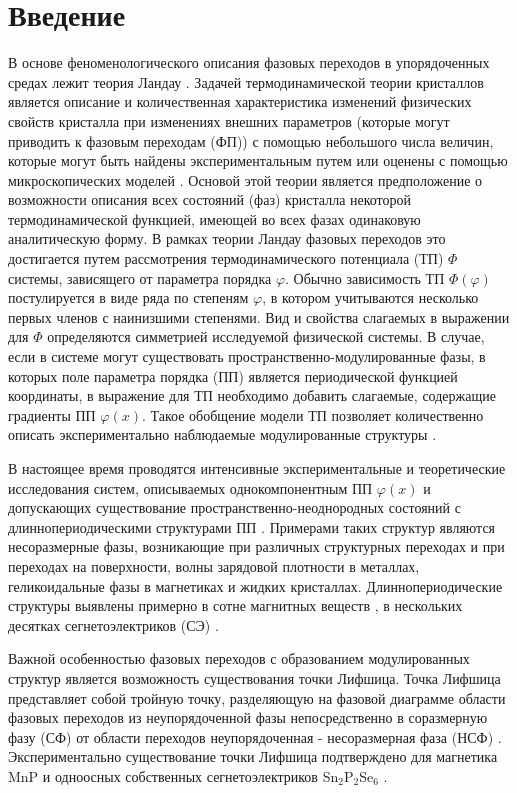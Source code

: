 
\chapter{Введение}\label{ch-intro}

В основе феноменологического описания фазовых переходов в упорядоченных средах лежит теория Ландау \cite{Landau1969, Toledano1994}.
Задачей термодинамической теории кристаллов является описание и количественная характеристика изменений физических свойств кристалла при изменениях внешних параметров (которые могут приводить к фазовым переходам (ФП)) с помощью небольшого числа величин, которые могут быть найдены экспериментальным путем или оценены с помощью микроскопических моделей \cite{Kholodenko1971}.
Основой этой теории является предположение о возможности описания всех состояний (фаз) кристалла некоторой термодинамической функцией, имеющей во всех фазах одинаковую аналитическую форму.
В рамках теории Ландау фазовых переходов это достигается путем рассмотрения термодинамического потенциала (ТП) $\Phi$ системы, зависящего от параметра порядка $\varphi$.
Обычно зависимость ТП  $\Phi(\varphi)$ постулируется в виде ряда по степеням $\varphi$, в котором учитываются несколько первых членов с наинизшими степенями.
Вид и свойства слагаемых в выражении для $\Phi$ определяются симметрией исследуемой физической системы.
В случае, если в системе могут существовать пространственно-модулированные фазы, в которых поле параметра порядка (ПП) является периодической функцией координаты, в выражение для ТП необходимо добавить слагаемые, содержащие градиенты ПП $\varphi(x)$.
Такое обобщение модели ТП позволяет количественно описать экспериментально наблюдаемые модулированные структуры \cite{Cummins1990, Vysochanskii1994}.

В настоящее время проводятся интенсивные экспериментальные и теоретические исследования систем, описываемых однокомпонентным ПП $\varphi(x)$ и допускающих существование пространственно-неоднородных состояний с длиннопериодическими структурами ПП \cite{Toledano1994, Cummins1990, Vysochanskii1992}.
Примерами таких структур являются несоразмерные фазы, возникающие при различных структурных переходах и при переходах на поверхности, волны зарядовой плотности в металлах, геликоидальные фазы в магнетиках и жидких кристаллах.
Длиннопериодические структуры выявлены примерно в сотне магнитных веществ \cite{Izjumov1987}, в нескольких десятках сегнетоэлектриков (СЭ) \cite{Cummins1990}.

Важной особенностью фазовых переходов с образованием модулированных структур является возможность существования точки Лифшица.
Точка Лифшица представляет собой тройную точку, разделяющую на фазовой диаграмме области фазовых переходов из неупорядоченной фазы непосредственно в соразмерную фазу (СФ) от области переходов неупорядоченная - несоразмерная фаза (НСФ) \cite{Cummins1990, Vysochanskii1992}.
Экспериментально существование точки Лифшица подтверждено для магнетика MnP и одноосных собственных сегнетоэлектриков Sn$_2$P$_2$Se$_6$ \cite{Vysochanskii1992}.
